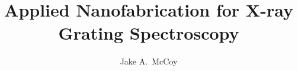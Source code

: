 \documentclass[phd,12pt]{psuthesis}
\title{Applied Nanofabrication for X-ray Grating Spectroscopy}
\author{Jake A.\ McCoy}
\begin{document}
\pagestyle{fancy}
\fancyhead[L,C,R]{}
\fancyfoot[L,R]{}
\fancyfoot[C]{\thepage}
\renewcommand{\headrulewidth}{0pt}
\renewcommand{\footrulewidth}{0pt}
\frontmatter

%

\psutitlepage

\psucommitteepage


\thesistableofcontents

\begin{singlespace}
\renewcommand{\listfigurename}{\sffamily\Huge List of Figures}
\setlength{\cftparskip}{\baselineskip}
\listoffigures
\end{singlespace}
\clearpage

\begin{singlespace}
\renewcommand{\listtablename}{\sffamily\Huge List of Tables}
\setlength{\cftparskip}{\baselineskip}
\listoftables
\end{singlespace}
\clearpage

\end{document}

